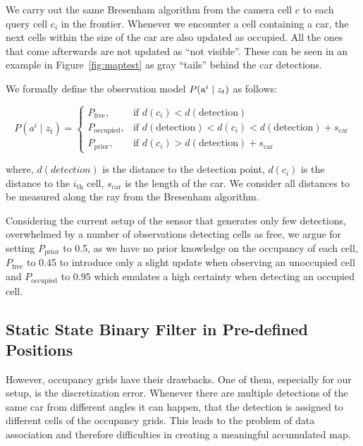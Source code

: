 We carry out the same Bresenham algorithm from the camera cell $c$ to each
query cell $c_i$ in the frontier. Whenever we encounter a cell containing a
car, the next cells within the size of the car are also updated as occupied.
All the ones that come afterwards are not updated as ``not visible''. These
can be seen in an example in Figure~\ref{fig:maptest} as gray ``tails'' behind
the car detections.

We formally define the observation model $P({\mbox{a}^i} \mid z_t)$ as follows:

\begin{equation}
\label{eq:observation_model}
P(a^i \mid z_t) = \begin{cases} P_{\mathrm{free}}, & \mbox{if } d(c_i) < d(\mathrm{detection}) \\ P_{\mathrm{occupied}}, & \mbox{if } d(\mathrm{detection}) < d(c_i) < d(\mathrm{detection}) + s_{\mathrm{car}} \\ P_{\mathrm{prior}}, & \mbox{if } d(c_i) > d(\mathrm{detection}) + s_{\mathrm{car}} \end{cases}
\end{equation}

where, $d(detection)$ is the distance to the detection point, $d(c_i)$ is the
distance to the $i_\mathrm{th}$ cell, $s_\mathrm{car}$ is the length of the car. We consider
all distances to be measured along the ray from the Bresenham algorithm.

Considering the current setup of the sensor that generates only few
detections, overwhelmed by a number of observations detecting cells as free,
we argue for setting $P_{\mathrm{prior}}$ to 0.5, as we have no prior
knowledge on the occupancy of each cell, $P_{\mathrm{free}}$ to 0.45 to
introduce only a slight update when observing an unoccupied cell and
$P_{\mathrm{occupied}}$ to 0.95 which emulates a high certainty when detecting
an occupied cell.


\subsection{Static State Binary Filter in Pre-defined Positions}
\label{sub:static_state_binary_filter_in_pre_defined_positions}

However, occupancy grids have their drawbacks. One of them, especially for our
setup, is the discretization error. Whenever there are multiple detections of
the same car from different angles it can happen, that the detection is
assigned to different cells of the occupancy grids. This leads to the problem
of data association and therefore difficulties in creating a meaningful
accumulated map.

